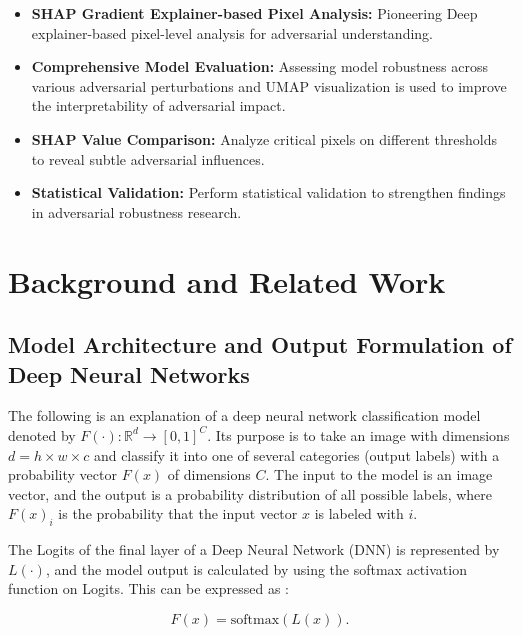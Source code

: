 \documentclass[10pt, conference, a4paper, final]{IEEEtran}
\begin{document}
\begin{itemize}
    \item \textbf{SHAP Gradient Explainer-based Pixel Analysis:} Pioneering Deep explainer-based pixel-level analysis for adversarial understanding.
    
    \item \textbf{Comprehensive Model Evaluation:} Assessing model robustness across various adversarial perturbations and UMAP visualization is used to improve the interpretability of adversarial impact.
    
    \item \textbf{SHAP Value Comparison:} Analyze critical pixels on different thresholds to reveal subtle adversarial influences.
    
    \item \textbf{Statistical Validation:} Perform statistical validation to strengthen findings in adversarial robustness research.

\end{itemize}

\section{Background and Related Work}

\subsection{Model Architecture and Output Formulation of Deep Neural Networks}



The following is an explanation of a deep neural network classification model denoted by \( F(\cdot) : \mathbb{R}^d \rightarrow [0, 1]^{C} \). Its purpose is to take an image with dimensions \( d = h \times w \times c \) and classify it into one of several categories (output labels) with a probability vector \( F(x) \) of dimensions \( C \). The input to the model is an image vector, and the output is a probability distribution of all possible labels, where \( F(x)_i \)  is the probability that the input vector \( x \)  is labeled with \( i \). 

The Logits of the final layer of a Deep Neural Network (DNN) is represented by \(L(\cdot)\), and the model output is calculated by using the softmax activation function on Logits. This can be expressed as \cite {ZhangS.}:

\begin{equation}
    F(x) = \text{softmax}(L(x)).
    \end{equation}
\end{document}
